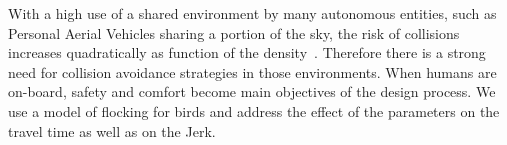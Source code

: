 With a high use of a shared environment by many autonomous entities, such as Personal Aerial Vehicles sharing a portion of the sky, the risk of collisions increases quadratically as function of the density~\cite{jardin_analytical_2005}. Therefore there is a strong need for collision avoidance strategies in those environments. When humans are on-board, safety and comfort become main objectives of the design process. We use a model of flocking for birds and address the effect of the parameters on the travel time as well as on the Jerk. 